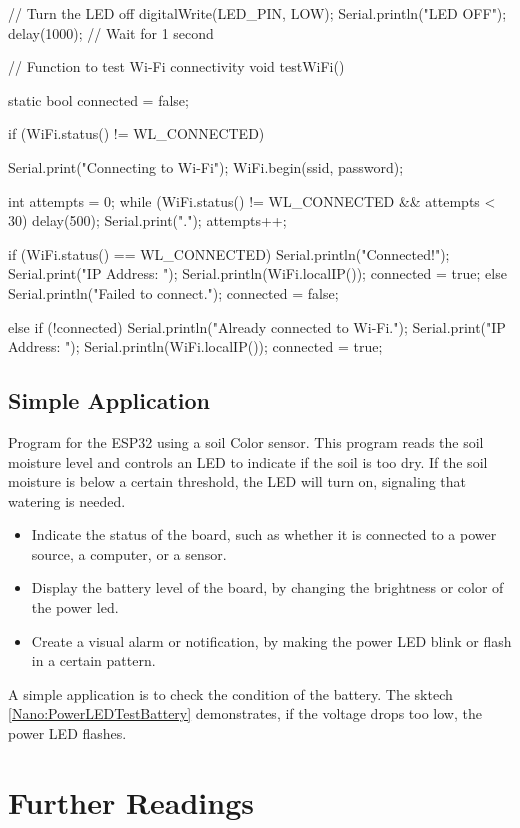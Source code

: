 \begin{Arduino}
{		// Turn the LED off
		digitalWrite(LED_PIN, LOW);
		Serial.println("LED OFF");
		delay(1000); // Wait for 1 second
	}
	
	// Function to test Wi-Fi connectivity
	void testWiFi() {
		static bool connected = false;
		
		if (WiFi.status() != WL_CONNECTED) {
			Serial.print("Connecting to Wi-Fi");
			WiFi.begin(ssid, password);
			
			int attempts = 0;
			while (WiFi.status() != WL_CONNECTED && attempts < 30) {
				delay(500);
				Serial.print(".");
				attempts++;
			}
			
			if (WiFi.status() == WL_CONNECTED) {
				Serial.println("Connected!");
				Serial.print("IP Address: ");
				Serial.println(WiFi.localIP());
				connected = true;
			} else {
				Serial.println("Failed to connect.");
				connected = false;
			}
		} else if (!connected) {
			Serial.println("Already connected to Wi-Fi.");
			Serial.print("IP Address: ");
			Serial.println(WiFi.localIP());
			connected = true;
		}
	}
	
	
\end{Arduino}

\subsection{Simple Application}

Program for the ESP32 using a soil Color sensor. This program reads the soil moisture level and controls an LED to indicate if the soil is too dry. If the soil moisture is below a certain threshold, the LED will turn on, signaling that watering is needed.

\begin{itemize}
	\item Indicate the status of the board, such as whether it is connected to a power source, a computer, or a sensor.
	\item  Display the battery level of the board, by changing the brightness or color of the power \ac{led}.
	\item Create a visual alarm or notification, by making the power LED blink or flash in a certain pattern.
\end{itemize}

\bigskip

A simple application is to check the condition of the battery. The sktech \ref{Nano:PowerLEDTestBattery} demonstrates, if the voltage drops too low, the power LED flashes.

{
	\label{Nano:PowerLEDTestBattery}
}



\section{Further Readings}

